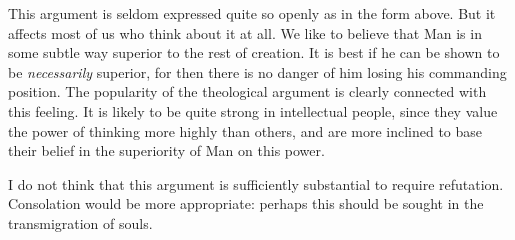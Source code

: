     This argument is seldom expressed quite so openly as in the form above. But it affects most of us who think about it at all. We like to believe that Man is in some subtle way superior to the rest of creation. It is best if he can be shown to be \textit{necessarily} superior, for then there is no danger of him losing his commanding position. The popularity of the theological argument is clearly connected with this feeling. It is likely to be quite strong in intellectual people, since they value the power of thinking more highly than others, and are more inclined to base their belief in the superiority of Man on this power.

    I do not think that this argument is sufficiently substantial to require refutation. Consolation would be more appropriate: perhaps this should be sought in the transmigration of souls.

